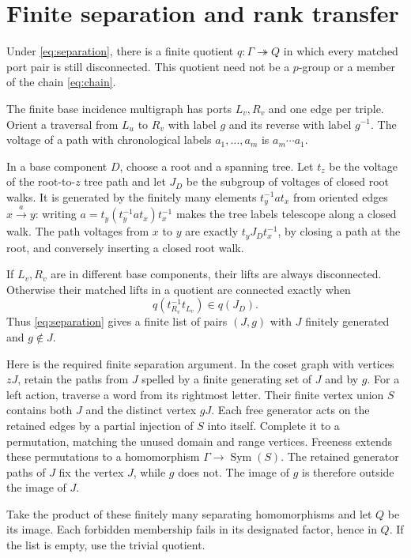 \section{Finite separation and rank transfer}\label{sec:separation}

\begin{lemma}\label{lem:separator}
\notformalized
Under \eqref{eq:separation}, there is a finite quotient
$q:\Gamma\twoheadrightarrow Q$ in which every matched port pair is
still disconnected. This quotient need not be a $p$-group or a member
of the chain \eqref{eq:chain}.
\end{lemma}
\begin{informalproof}
The finite base incidence multigraph has ports $L_v,R_v$ and one
edge per triple. Orient a traversal from $L_u$ to $R_v$ with label
$g$ and its reverse with label $g^{-1}$. The voltage of a path with
chronological labels $a_1,\ldots,a_m$ is $a_m\cdots a_1$.

In a base component $D$, choose a root and a spanning tree. Let $t_z$
be the voltage of the root-to-$z$ tree path and let $J_D$ be the
subgroup of voltages of closed root walks. It is generated by the
finitely many elements $t_y^{-1}a t_x$ from oriented edges
$x\xrightarrow{a}y$: writing $a=t_y(t_y^{-1}a t_x)t_x^{-1}$
makes the tree labels telescope along a closed walk. The path
voltages from $x$ to $y$ are exactly $t_yJ_Dt_x^{-1}$, by closing
a path at the root, and conversely inserting a closed root walk.

If $L_v,R_v$ are in different base components, their lifts are always
disconnected. Otherwise their matched lifts in a quotient are connected
exactly when
\[
 q(t_{R_v}^{-1}t_{L_v})\in q(J_D).
\]
Thus \eqref{eq:separation} gives a finite list of pairs $(J,g)$ with
$J$ finitely generated and $g\notin J$.

Here is the required finite separation argument. In the coset graph
with vertices $zJ$, retain the paths from $J$ spelled by a finite
generating set of $J$ and by $g$. For a left action, traverse a word
from its rightmost letter. Their finite vertex union $S$ contains
both $J$ and the distinct vertex $gJ$. Each free generator acts on
the retained edges by a partial injection of $S$ into itself. Complete
it to a permutation, matching the unused domain and range vertices.
Freeness extends these permutations to a homomorphism
$\Gamma\to\operatorname{Sym}(S)$. The retained generator paths of
$J$ fix the vertex $J$, while $g$ does not. The image of $g$ is
therefore outside the image of $J$.

Take the product of these finitely many separating homomorphisms and
let $Q$ be its image. Each forbidden membership fails in its designated
factor, hence in $Q$. If the list is empty, use the trivial quotient.
\end{informalproof}

